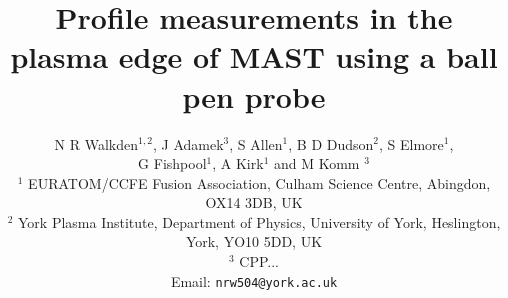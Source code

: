 \documentclass[11pt]{iopart}
\begin{document}
\title{\textbf{Profile measurements in the plasma edge of MAST using a ball pen probe}}
\author{ N R Walkden$^{1,2}$, J Adamek$^{3}$, S Allen$^{1}$, B D Dudson$^{2}$, S Elmore$^{1}$, \\G Fishpool$^{1}$, A Kirk$^{1}$ and M Komm $^{3}$
        \\ \small{$^{1}$ EURATOM/CCFE Fusion Association, Culham Science Centre, Abingdon, OX14 3DB, UK} 
        \\ \small{$^{2}$ York Plasma Institute, Department of Physics, University of York, Heslington, York, YO10 5DD, UK} 
        \\ \small{$^{3}$ CPP...}
        \\ Email: \texttt{nrw504@york.ac.uk} }
\date{}

\begin{abstract}

\end{abstract}
\end{document}
